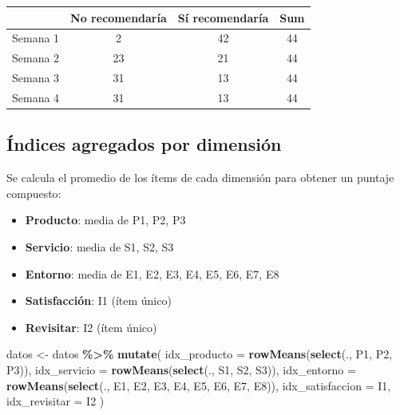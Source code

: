 \documentclass[
  spanish,
]{article}
\newenvironment{Shaded}{\begin{snugshade}}{\end{snugshade}}
\newcommand{\AttributeTok}[1]{\textcolor[rgb]{0.13,0.29,0.53}{#1}}
\newcommand{\FunctionTok}[1]{\textcolor[rgb]{0.13,0.29,0.53}{\textbf{#1}}}
\newcommand{\NormalTok}[1]{#1}
\newcommand{\OtherTok}[1]{\textcolor[rgb]{0.56,0.35,0.01}{#1}}
\newcommand{\SpecialCharTok}[1]{\textcolor[rgb]{0.81,0.36,0.00}{\textbf{#1}}}
\begin{document}
\begin{table}[!h]
\centering
\begin{tabular}{lccc}
\toprule
  & No recomendaría & Sí recomendaría & Sum\\
\midrule
Semana 1 & 2 & 42 & 44\\
Semana 2 & 23 & 21 & 44\\
Semana 3 & 31 & 13 & 44\\
Semana 4 & 31 & 13 & 44\\
\bottomrule
\end{tabular}
\end{table}

\subsection{Índices agregados por
dimensión}\label{uxedndices-agregados-por-dimensiuxf3n}

Se calcula el promedio de los ítems de cada dimensión para obtener un
puntaje compuesto:

\begin{itemize}
  \item \textbf{Producto}: media de P1, P2, P3
  \item \textbf{Servicio}: media de S1, S2, S3
  \item \textbf{Entorno}: media de E1, E2, E3, E4, E5, E6, E7, E8
  \item \textbf{Satisfacción}: I1 (ítem único)
  \item \textbf{Revisitar}: I2 (ítem único)
\end{itemize}

\begin{Shaded}
\begin{Highlighting}[]
\NormalTok{datos }\OtherTok{\textless{}{-}}\NormalTok{ datos }\SpecialCharTok{\%\textgreater{}\%}
  \FunctionTok{mutate}\NormalTok{(}
    \AttributeTok{idx\_producto     =} \FunctionTok{rowMeans}\NormalTok{(}\FunctionTok{select}\NormalTok{(., P1, P2, P3)),}
    \AttributeTok{idx\_servicio     =} \FunctionTok{rowMeans}\NormalTok{(}\FunctionTok{select}\NormalTok{(., S1, S2, S3)),}
    \AttributeTok{idx\_entorno      =} \FunctionTok{rowMeans}\NormalTok{(}\FunctionTok{select}\NormalTok{(., E1, E2, E3, E4, E5, E6, E7, E8)),}
    \AttributeTok{idx\_satisfaccion =}\NormalTok{ I1,}
    \AttributeTok{idx\_revisitar    =}\NormalTok{ I2}
\NormalTok{  )}
\end{Highlighting}
\end{Shaded}
\end{document}
